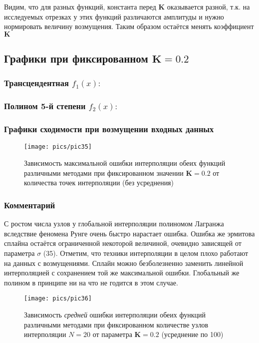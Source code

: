 Видим, что для разных функций, константа перед $\mathbf{K}$ оказывается разной, т.к. на исследуемых отрезках у этих функций различаются амплитуды и нужно нормировать величину возмущения. Таким образом остаётся менять коэффициент $\mathbf{K}$

\subsection{Графики при фиксированном $\mathbf{K}=0.2$}
\subsubsection{Трансцендентная $f_1(x):$}


\subsubsection{Полином 5-й степени $f_2(x):$}


\subsubsection{Графики сходимости при возмущении входных данных}
\begin{figure}[H]
    \centering
    \caption{Зависимость максимальной ошибки интерполяции обеих функций различными методами при фиксированном значении $\mathbf{K}=0.2$ от количества точек интерполяции (без усреднения)}
    \texttt{[image: pics/pic35]}
    \label{pic:35}
\end{figure}

\subsubsection*{Комментарий}
С ростом числа узлов у глобальной интерполяции полиномом Лагранжа вследствие феномена Рунге очень быстро нарастает ошибка. Ошибка же эрмитова сплайна остаётся ограниченной некоторой величиной, очевидно зависящей от параметра $\sigma$ (35). Отметим, что техники интерполяции в целом плохо работают на данных с возмущениями. Сплайн можно  безболезненно заменить линейной интерполяцией с сохранением той же максимальной ошибки. Глобальный же полином в принципе ни на что не годится в этом случае.

\begin{figure}[H]
    \centering
    \caption{Зависимость {\it средней} ошибки интерполяции обеих функций различными методами при фиксированном количестве узлов интерполяции $N=20$ от параметра $\mathbf{K}=0.2$ (усреднение по 100)}
    \texttt{[image: pics/pic36]}
    \label{pic:36}
\end{figure}

